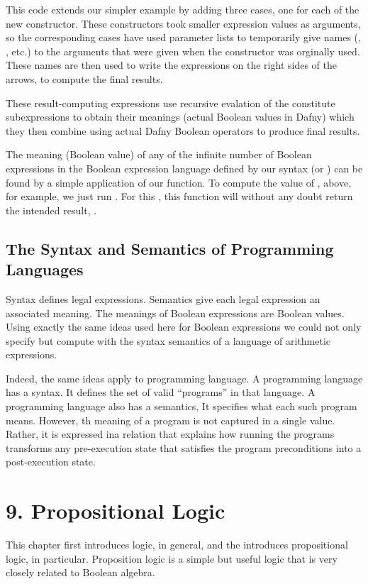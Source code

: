 \documentclass[letterpaper,10pt,english]{sphinxmanual}
\begin{document}
This code extends our simpler example by adding three cases, one for
each of the new constructor. These constructors took smaller
expression values as arguments, so the corresponding cases have used
parameter lists to temporarily give names (, , etc.) to the
arguments that were given when the constructor was orginally used.
These names are then used to write the expressions on the right sides
of the arrows, to compute the final results.

These result-computing expressions use recursive evalation of the
constitute subexpressions to obtain their meanings (actual Boolean
values in Dafny) which they then combine using actual Dafny Boolean
operators to produce final results.

The meaning (Boolean value) of any of the infinite number of Boolean
expressions in the Boolean expression language defined by our syntax
(or ) can be found by a simple application of our 
function. To compute the value of , above, for example, we just run
. For this , this function will without any doubt return
the intended result, .


\section{The Syntax and Semantics of Programming Languages}
\label{\detokenize{08-boolean-algebra:the-syntax-and-semantics-of-programming-languages}}
Syntax defines legal expressions. Semantics give each legal expression
an associated meaning. The meanings of Boolean expressions are Boolean
values. Using exactly the same ideas used here for Boolean expressions
we could not only specify but compute with the syntax semantics of a
language of arithmetic expressions.

Indeed, the same ideas apply to programming language. A programming
language has a syntax. It defines the set of valid “programs” in that
language. A programming language also has a semantics, It specifies
what each such program means. However, th meaning of a program is not
captured in a single value. Rather, it is expressed ina relation that
explains how running the programs transforms any pre-execution state
that satisfies the program preconditions into a post-execution state.


\chapter{9. Propositional Logic}
\label{\detokenize{09-propositional-logic::doc}}\label{\detokenize{09-propositional-logic:propositional-logic}}
This chapter first introduces logic, in general, and the introduces
propositional logic, in particular. Proposition logic is a simple but
useful logic that is very closely related to Boolean algebra.
\end{document}
